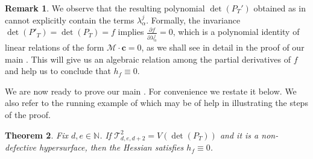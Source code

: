 \documentclass[letterpaper,11pt]{amsart}
\theoremstyle{plain}
\newtheorem{theorem}{Theorem}[section]
\theoremstyle{definition}
\newtheorem{remark}[theorem]{Remark}
\begin{document}
\begin{remark}
We observe that the resulting polynomial $\det(P_T')$ obtained as in  cannot explicitly contain the terms $\lambda_{\alpha}^j$. Formally, the invariance $\det(P'_T) = \det(P_T) = f$ implies $\frac{\partial f}{\partial \lambda^j_\alpha} = 0$,
which is a polynomial identity of linear relations of the form $\mathcal M \cdot \mathbf{c} = 0$, as we shall see in detail  in the proof of our main . This will give us an algebraic relation among the partial derivatives of $f$ and help us to conclude that $h_f\equiv 0$.
 \end{remark}



We are now ready to prove our main . For convenience we restate it below. We also refer to the running example of  which may be of help in illustrating the steps of the proof. 

\begingroup
\def\thetheorem{\ref{theorem: main}}
\begin{theorem}
Fix $d, e \in \mathbb{N}$. If $\mathcal{T}^2_{d,e,d+2} = V(\det(P_T))$  
 and it is a non-defective hypersurface, 
then the Hessian satisfies $h_f \equiv 0$.
\end{theorem}
\addtocounter{theorem}{-1}
\endgroup
\end{document}
